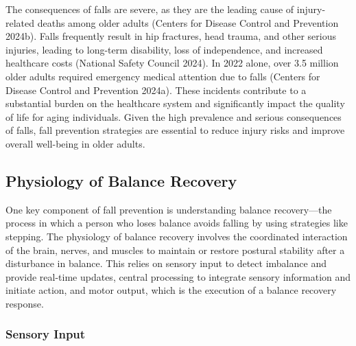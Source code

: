 \documentclass[
  letterpaper,
  DIV=11,
  numbers=noendperiod]{scrartcl}
\begin{document}
The consequences of falls are severe, as they are the leading cause of
injury-related deaths among older adults (Centers for Disease Control
and Prevention 2024b). Falls frequently result in hip fractures, head
trauma, and other serious injuries, leading to long-term disability,
loss of independence, and increased healthcare costs (National Safety
Council 2024). In 2022 alone, over 3.5 million older adults required
emergency medical attention due to falls (Centers for Disease Control
and Prevention 2024a). These incidents contribute to a substantial
burden on the healthcare system and significantly impact the quality of
life for aging individuals. Given the high prevalence and serious
consequences of falls, fall prevention strategies are essential to
reduce injury risks and improve overall well-being in older adults.

\subsection{Physiology of Balance
Recovery}\label{physiology-of-balance-recovery}

One key component of fall prevention is understanding balance
recovery---the process in which a person who loses balance avoids
falling by using strategies like stepping. The physiology of balance
recovery involves the coordinated interaction of the brain, nerves, and
muscles to maintain or restore postural stability after a disturbance in
balance. This relies on sensory input to detect imbalance and provide
real-time updates, central processing to integrate sensory information
and initiate action, and motor output, which is the execution of a
balance recovery response.

\subsubsection{Sensory Input}\label{sensory-input}
\end{document}
